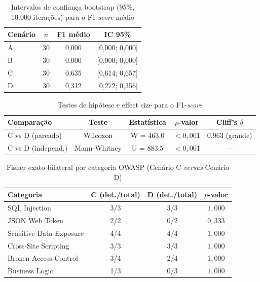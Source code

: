 
\begin{table}[htbp]\centering
\caption{Intervalos de confiança bootstrap (95\%, 10.000 iterações) para o F1-\emph{score} médio}
\label{tab:bootstrap-ci}
\begin{tabular}{lccc}
\toprule
\textbf{Cenário} & \textbf{$n$} & \textbf{F1 médio} & \textbf{IC 95\%} \\
\midrule
A & 30 & 0{,}000 & [0{,}000; 0{,}000] \\
B & 30 & 0{,}000 & [0{,}000; 0{,}000] \\
C & 30 & 0{,}635 & [0{,}614; 0{,}657] \\
D & 30 & 0{,}312 & [0{,}272; 0{,}356] \\
\bottomrule\end{tabular}\end{table}
\begin{table}[htbp]\centering
\caption{Testes de hipótese e effect size para o F1-\emph{score}}
\label{tab:testes-hipotese}
\begin{tabular}{lcccc}
\toprule
\textbf{Comparação} & \textbf{Teste} & \textbf{Estatística} & \textbf{$p$-valor} & \textbf{Cliff's $\delta$} \\
\midrule
C vs D (pareado)    & Wilcoxon      & W = 463{,}0 & $< 0{,}001$ & 0{,}963 (grande) \\
C vs D (independ{,})  & Mann-Whitney  & U = 883{,}5 & $< 0{,}001$ & --- \\
\bottomrule\end{tabular}\end{table}
\begin{table}[htbp]\centering
\caption{Fisher exato bilateral por categoria OWASP (Cenário C \emph{versus} Cenário D)}
\label{tab:fisher-categorias}
\begin{tabular}{lccc}
\toprule
\textbf{Categoria} & \textbf{C (det./total)} & \textbf{D (det./total)} & \textbf{$p$-valor} \\
\midrule
SQL Injection & 3/3 & 3/3 & $1{,}000$ \\
JSON Web Token & 2/2 & 0/2 & $0{,}333$ \\
Sensitive Data Exposure & 4/4 & 4/4 & $1{,}000$ \\
Cross-Site Scripting & 3/3 & 3/3 & $1{,}000$ \\
Broken Access Control & 3/4 & 2/4 & $1{,}000$ \\
Business Logic & 1/3 & 0/3 & $1{,}000$ \\
\bottomrule\end{tabular}\end{table}